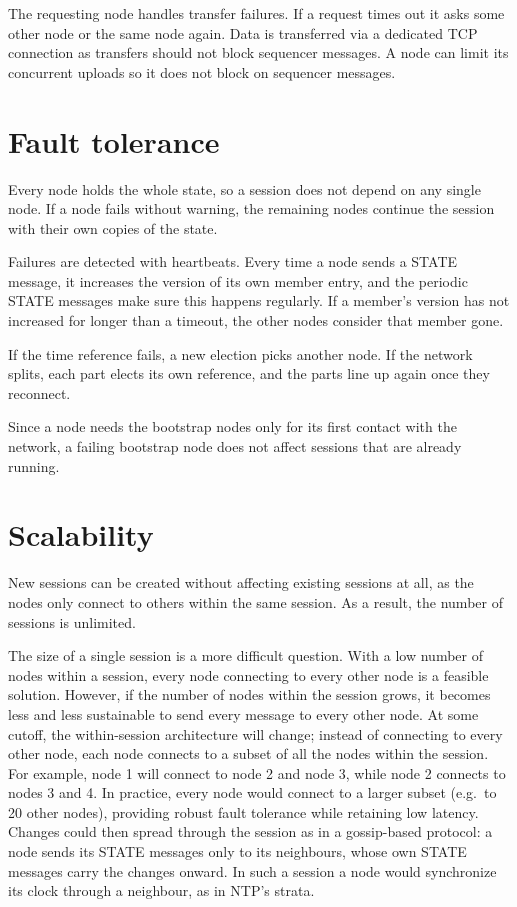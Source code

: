 \documentclass{article}
\begin{document}
The requesting node handles transfer failures.
If a request times out it asks some other node or the same node again.
Data is transferred via a dedicated TCP connection as transfers should not block sequencer messages.
A node can limit its concurrent uploads so it does not block on sequencer messages.

\section{Fault tolerance}

Every node holds the whole state, so a session does not depend on any single node. If a node fails without warning, the remaining nodes continue the session with their own copies of the state.

Failures are detected with heartbeats. Every time a node sends a STATE message, it increases the version of its own member entry, and the periodic STATE messages make sure this happens regularly. If a member's version has not increased for longer than a timeout, the other nodes consider that member gone.

If the time reference fails, a new election picks another node. If the network splits, each part elects its own reference, and the parts line up again once they reconnect.

Since a node needs the bootstrap nodes only for its first contact with the network, a failing bootstrap node does not affect sessions that are already running.

\section{Scalability}

New sessions can be created without affecting existing sessions at all, as the nodes only connect to others within the same session. As a result, the number of sessions is unlimited.

The size of a single session is a more difficult question. With a low number of nodes within a session, every node connecting to every other node is a feasible solution. However, if the number of nodes within the session grows, it becomes less and less sustainable to send every message to every other node. At some cutoff, the within-session architecture will change; instead of connecting to every other node, each node connects to a subset of all the nodes within the session. For example, node 1 will connect to node 2 and node 3, while node 2 connects to nodes 3 and 4. In practice, every node would connect to a larger subset (e.g.\ to 20 other nodes), providing robust fault tolerance while retaining low latency. Changes could then spread through the session as in a gossip-based protocol: a node sends its STATE messages only to its neighbours, whose own STATE messages carry the changes onward. In such a session a node would synchronize its clock through a neighbour, as in NTP's strata.
\end{document}
